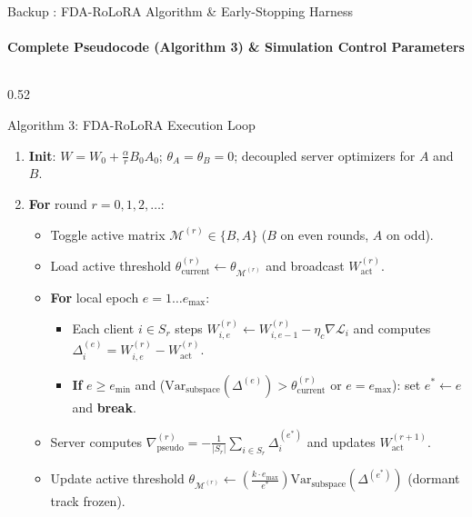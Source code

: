 \documentclass[aspectratio=169]{beamer}
\begin{document}
\begin{frame}[noframenumbering, label=backup_algo]{Backup : FDA-RoLoRA Algorithm \& Early-Stopping Harness}
    \framesubtitle{Complete Pseudocode (Algorithm 3) \& Simulation Control Parameters \hfill \hyperlink{main_impl}{} \; \hyperlink{thank_you}{}}
    \vspace{-0.55em}
    \tiny
    \begin{columns}[t]
        \begin{column}{0.52\textwidth}
            \begin{block}{Algorithm 3: FDA-RoLoRA Execution Loop}
                \begin{enumerate}
                    \item \textbf{Init}: $W = W_0 + \frac{\alpha}{r} B_0 A_0$; $\theta_A = \theta_B = 0$; decoupled server optimizers for $A$ and $B$.
                    \item \textbf{For} round $r = 0, 1, 2, \dots$:
                    \begin{itemize}
                        \tiny
                        \item Toggle active matrix $\mathcal{M}^{(r)} \in \{B, A\}$ ($B$ on even rounds, $A$ on odd).
                        \item Load active threshold $\theta_{\text{current}}^{(r)} \leftarrow \theta_{\mathcal{M}^{(r)}}$ and broadcast $W_{\text{act}}^{(r)}$.
                        \item \textbf{For} local epoch $e = 1 \dots e_{\max}$:
                        \begin{itemize}
                            \tiny
                            \item Each client $i \in S_r$ steps $W_{i,e}^{(r)} \leftarrow W_{i,e-1}^{(r)} - \eta_c \nabla \mathcal{L}_i$ and computes $\Delta_i^{(e)} = W_{i,e}^{(r)} - W_{\text{act}}^{(r)}$.
                            \item \textbf{If} $e \ge e_{\min}$ and ($\text{Var}_{\text{subspace}}(\Delta^{(e)}) > \theta_{\text{current}}^{(r)}$ or $e = e_{\max}$): set $e^* \leftarrow e$ and \textbf{break}.
                        \end{itemize}
                        \item Server computes $\nabla_{\text{pseudo}}^{(r)} = -\frac{1}{|S_r|}\sum_{i \in S_r} \Delta_i^{(e^*)}$ and updates $W_{\text{act}}^{(r+1)}$.
                        \item Update active threshold $\theta_{\mathcal{M}^{(r)}} \leftarrow \left(\frac{k \cdot e_{\max}}{e^*}\right)\text{Var}_{\text{subspace}}(\Delta^{(e^*)})$ (dormant track frozen).

\end{itemize}
\end{enumerate}
\end{block}
\end{column}
\end{columns}
\end{frame}
\end{document}
